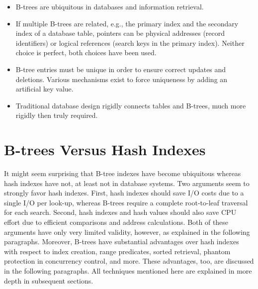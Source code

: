 \begin{itemize}
\item
  B-trees are ubiquitous in databases and information retrieval.
\item
  If multiple B-trees are related, e.g., the primary index and the
  secondary index of a database table, pointers can be physical
  addresses (record identifiers) or logical references (search keys in
  the primary index). Neither choice is perfect, both choices have been
  used.
\item
  B-tree entries must be unique in order to ensure correct updates and
  deletions. Various mechanisms exist to force uniqueness by adding an
  artificial key value.
\item
  Traditional database design rigidly connects tables and B-trees, much
  more rigidly then truly required.
\end{itemize}

\hypertarget{b-trees-versus-hash-indexes}{%
\section{B-trees Versus Hash
Indexes}\label{b-trees-versus-hash-indexes}}

It might seem surprising that B-tree indexes have become ubiquitous
whereas hash indexes have not, at least not in database systems. Two
arguments seem to strongly favor hash indexes. First, hash indexes
should save I/O costs due to a single I/O per look-up, whereas B-trees
require a complete root-to-leaf traversal for each search. Second, hash
indexes and hash values should also save CPU effort due to efficient
comparisons and address calculations. Both of these arguments have only
very limited validity, however, as explained in the following
paragraphs. Moreover, B-trees have substantial advantages over hash
indexes with respect to index creation, range predicates, sorted
retrieval, phantom protection in concurrency control, and more. These
advantages, too, are discussed in the following paragraphs. All
techniques mentioned here are explained in more depth in subsequent
sections.

